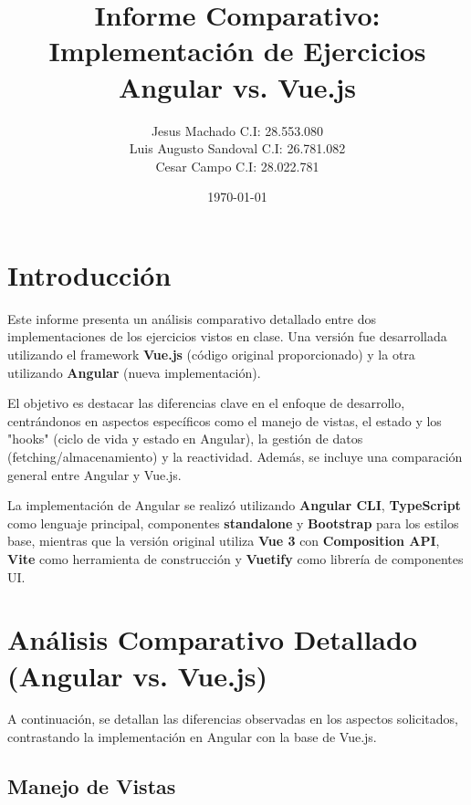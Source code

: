 \documentclass[11pt, a4paper]{article}
\title{Informe Comparativo: Implementación de Ejercicios \\ Angular vs. Vue.js}
\author{Jesus Machado C.I: 28.553.080\\
        Luis Augusto Sandoval C.I: 26.781.082 \\
        Cesar Campo C.I: 28.022.781 }
\date{\today}
\begin{document}
\maketitle
\thispagestyle{empty} %
\newpage

\tableofcontents
\newpage

\section{Introducción}
Este informe presenta un análisis comparativo detallado entre dos implementaciones de los ejercicios vistos en clase. Una versión fue desarrollada utilizando el framework \textbf{Vue.js} (código original proporcionado) y la otra utilizando \textbf{Angular} (nueva implementación).

El objetivo es destacar las diferencias clave en el enfoque de desarrollo, centrándonos en aspectos específicos como el manejo de vistas, el estado y los "hooks" (ciclo de vida y estado en Angular), la gestión de datos (fetching/almacenamiento) y la reactividad. Además, se incluye una comparación general entre Angular y Vue.js.

La implementación de Angular se realizó utilizando \textbf{Angular CLI}, \textbf{TypeScript} como lenguaje principal, componentes \textbf{standalone} y \textbf{Bootstrap} para los estilos base, mientras que la versión original utiliza \textbf{Vue 3} con \textbf{Composition API}, \textbf{Vite} como herramienta de construcción y \textbf{Vuetify} como librería de componentes UI.

\section{Análisis Comparativo Detallado (Angular vs. Vue.js)}

A continuación, se detallan las diferencias observadas en los aspectos solicitados, contrastando la implementación en Angular con la base de Vue.js.

\subsection{Manejo de Vistas}
\end{document}
